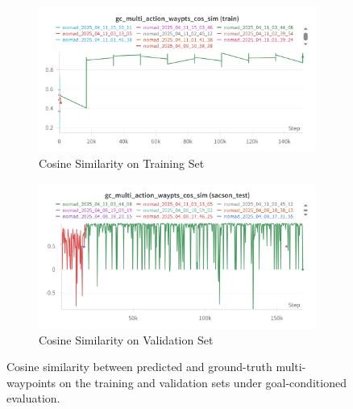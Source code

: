 \documentclass[12pt]{article}
\begin{document}
\begin{figure}[H]
    \centering
    \begin{subfigure}[b]{0.48\textwidth}
        \centering
        \includegraphics[width=\textwidth]{images/gc_multi_action_waypts_cos_sim.png}
        \caption{Cosine Similarity on Training Set}
        \label{fig:gc_multi_action_waypts_cos_sim}
    \end{subfigure}
    \hfill
    \begin{subfigure}[b]{0.48\textwidth}
        \centering
        \includegraphics[width=\textwidth]{images/gc_multi_action_waypts_cos_sim_test.png}
        \caption{Cosine Similarity on Validation Set}
        \label{fig:gc_action_multi_waypts_cos_sim_test}
    \end{subfigure}
    \caption{Cosine similarity between predicted and ground-truth multi-waypoints on the training and validation sets under goal-conditioned evaluation.}
\end{figure}
\end{document}
